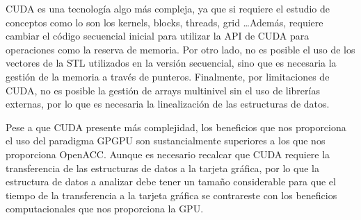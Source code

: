 CUDA es una tecnología algo más compleja, ya que si requiere el estudio de conceptos como lo son los kernels, blocks, threads, grid \dots Además, requiere cambiar el código secuencial inicial para utilizar la API de CUDA para operaciones como la reserva de memoria. Por otro lado, no es posible el uso de los vectores de la STL utilizados en la versión secuencial, sino que es necesaria la gestión de la memoria a través de punteros. Finalmente, por limitaciones de CUDA, no es posible la gestión de arrays multinivel sin el uso de librerías externas, por lo que es necesaria la linealización de las estructuras de datos.

Pese a que CUDA presente más complejidad, los beneficios que nos proporciona el uso del paradigma GPGPU son sustancialmente superiores a los que nos proporciona OpenACC. Aunque es necesario recalcar que CUDA requiere la transferencia de las estructuras de datos a la tarjeta gráfica, por lo que la estructura de datos a analizar debe tener un tamaño considerable para que el tiempo de la transferencia a la tarjeta gráfica se contrareste con los beneficios computacionales que nos proporciona la GPU.